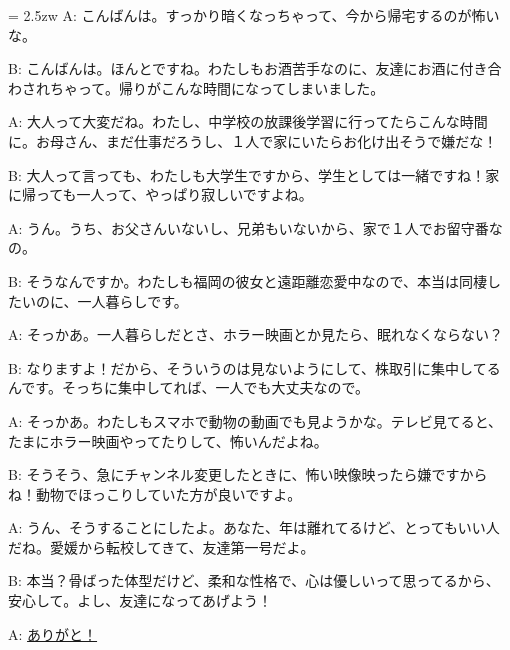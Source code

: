 \documentclass[11pt]{amsart}
\title{}
\author{}
\newenvironment{hangall}[1]{\hangindent = 2.5zw\everypar{\hangindent = 2.5zw}}{}
\begin{document}
\maketitle
\begin{hangall}{}%
A: こんばんは。すっかり暗くなっちゃって、今から帰宅するのが怖いな。

B: こんばんは。ほんとですね。わたしもお酒苦手なのに、友達にお酒に付き合わされちゃって。帰りがこんな時間になってしまいました。

A: 大人って大変だね。わたし、中学校の放課後学習に行ってたらこんな時間に。お母さん、まだ仕事だろうし、１人で家にいたらお化け出そうで嫌だな！

B: 大人って言っても、わたしも大学生ですから、学生としては一緒ですね！家に帰っても一人って、やっぱり寂しいですよね。

A: うん。うち、お父さんいないし、兄弟もいないから、家で１人でお留守番なの。

B: そうなんですか。わたしも福岡の彼女と遠距離恋愛中なので、本当は同棲したいのに、一人暮らしです。

A: そっかあ。一人暮らしだとさ、ホラー映画とか見たら、眠れなくならない？

B: なりますよ！だから、そういうのは見ないようにして、株取引に集中してるんです。そっちに集中してれば、一人でも大丈夫なので。

A: そっかあ。わたしもスマホで動物の動画でも見ようかな。テレビ見てると、たまにホラー映画やってたりして、怖いんだよね。

B: そうそう、急にチャンネル変更したときに、怖い映像映ったら嫌ですからね！動物でほっこりしていた方が良いですよ。

A: うん、そうすることにしたよ。あなた、年は離れてるけど、とってもいい人だね。愛媛から転校してきて、友達第一号だよ。

B: 本当？骨ばった体型だけど、柔和な性格で、心は優しいって思ってるから、安心して。よし、友達になってあげよう！

A: \ul{ありがと！}\end{hangall}
\end{document}
